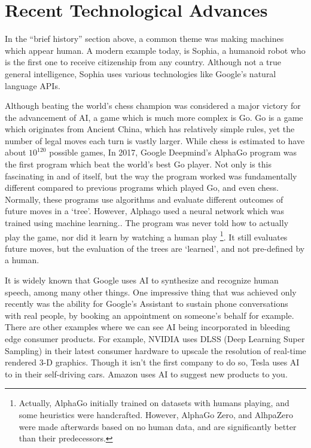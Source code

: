 \documentclass[letterpaper,12pt]{article}
\begin{document}
\section{Recent Technological Advances}

In the ``brief history'' section above, a common theme was making machines
which appear human. A modern example today, is Sophia, a humanoid robot
who is the first one to receive citizenship from any country.
Although not a true general intelligence\cite{sopiaAI}, Sophia uses various 
technologies like Google's natural language APIs.

Although beating the world's chess champion was considered a major
victory for the advancement of AI,
a game which is much more complex is Go.
Go is a game which originates from Ancient China,
which has relatively simple rules, yet the number of legal
moves each turn is vastly larger. While chess is estimated to have about $10^{120}$ 
possible games, 
In 2017, Google Deepmind's AlphaGo program was the first program which beat the world's
best Go player. Not only is this fascinating in and of itself, but the 
way the program worked was fundamentally different compared to previous 
programs which played Go, and even chess. Normally, these programs
use algorithms and evaluate different outcomes of future moves
in a `tree'. However, Alphago used a neural network which was trained
using machine learning.\cite{alphagopaper}. The program was never told how to
actually play the game, nor did it learn by watching a human play
\footnote{Actually, AlphaGo initially trained on datasets with humans playing,
and some heuristics were handcrafted. However, AlphaGo Zero, and AlhpaZero
were made afterwards based on no human data, and are significantly
better than their predecessors.}. It still
evaluates future moves, but the evaluation of the trees are `learned', and 
not pre-defined by a human.

It is widely known that Google uses AI to synthesize and recognize human speech,
among many other things. One impressive thing that was
achieved only recently was the
ability for Google's Assistant to sustain phone conversations with real
people, by booking an appointment on someone's behalf for example. \cite{googleduplex} 
There are other examples where we can see AI being incorporated in bleeding edge consumer products.
For example, NVIDIA uses DLSS (Deep Learning Super Sampling) in their latest consumer hardware to
upscale the resolution of real-time rendered 3-D graphics.\cite{dlss}
Though it isn't the first company to do so, Tesla uses AI to in their self-driving cars.\cite{teslaautopilot}
Amazon uses AI to suggest new products to you.\cite{aznai}
\end{document}
